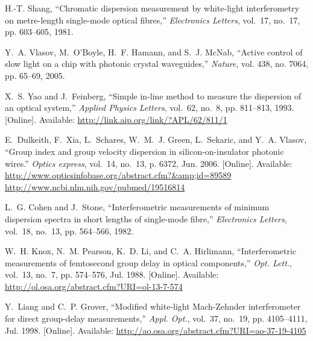 \documentclass[journal]{IEEEtran}
\begin{document}
\begin{thebibliography}{10}
H.-T. Shang, ``{Chromatic dispersion measurement by white-light interferometry
  on metre-length single-mode optical fibres},'' \emph{Electronics Letters},
  vol.~17, no.~17, pp. 603--605, 1981.

Y.~A. Vlasov, M.~O'Boyle, H.~F. Hamann, and S.~J. McNab, ``{Active control of
  slow light on a chip with photonic crystal waveguides},'' \emph{Nature}, vol.
  438, no. 7064, pp. 65--69, 2005.

\BIBentryALTinterwordspacing
X.~S. Yao and J.~Feinberg, ``{Simple in-line method to measure the dispersion
  of an optical system},'' \emph{Applied Physics Letters}, vol.~62, no.~8, pp.
  811--813, 1993. [Online]. Available:
  \url{http://link.aip.org/link/?APL/62/811/1}
\BIBentrySTDinterwordspacing

\BIBentryALTinterwordspacing
E.~Dulkeith, F.~Xia, L.~Schares, W.~M.~J. Green, L.~Sekaric, and Y.~A. Vlasov,
  ``{Group index and group velocity dispersion in silicon-on-insulator photonic
  wires.}'' \emph{Optics express}, vol.~14, no.~13, p. 6372, Jun. 2006.
  [Online]. Available:
  \url{http://www.opticsinfobase.org/abstract.cfm?\&amp;id=89589
  http://www.ncbi.nlm.nih.gov/pubmed/19516814}
\BIBentrySTDinterwordspacing

L.~G. Cohen and J.~Stone, ``{Interferometric measurements of minimum dispersion
  spectra in short lengths of single-mode fibre},'' \emph{Electronics Letters},
  vol.~18, no.~13, pp. 564--566, 1982.

\BIBentryALTinterwordspacing
W.~H. Knox, N.~M. Pearson, K.~D. Li, and C.~A. Hirlimann, ``{Interferometric
  measurements of femtosecond group delay in optical components},'' \emph{Opt.
  Lett.}, vol.~13, no.~7, pp. 574--576, Jul. 1988. [Online]. Available:
  \url{http://ol.osa.org/abstract.cfm?URI=ol-13-7-574}
\BIBentrySTDinterwordspacing

\BIBentryALTinterwordspacing
Y.~Liang and C.~P. Grover, ``{Modified white-light Mach-Zehnder interferometer
  for direct group-delay measurements},'' \emph{Appl. Opt.}, vol.~37, no.~19,
  pp. 4105--4111, Jul. 1998. [Online]. Available:
  \url{http://ao.osa.org/abstract.cfm?URI=ao-37-19-4105}
\BIBentrySTDinterwordspacing

\end{thebibliography}

%
%
\end{document}
